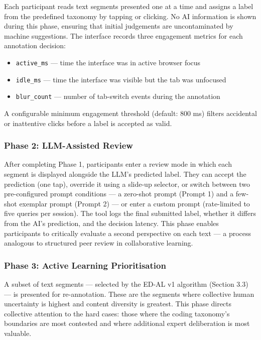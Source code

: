\documentclass[fleqn,10pt]{JLA_article}
\begin{document}
Each participant reads text segments presented one at a time and assigns a label from
the predefined taxonomy by tapping or clicking. No AI information is shown during this
phase, ensuring that initial judgements are uncontaminated by machine suggestions.
The interface records three engagement metrics for each annotation decision:

\begin{itemize}[noitemsep]
  \item \texttt{active\_ms} — time the interface was in active browser focus
  \item \texttt{idle\_ms} — time the interface was visible but the tab was unfocused
  \item \texttt{blur\_count} — number of tab-switch events during the annotation
\end{itemize}

A configurable minimum engagement threshold (default: 800 ms) filters accidental or
inattentive clicks before a label is accepted as valid.

\subsubsection{Phase 2: LLM-Assisted Review}

After completing Phase 1, participants enter a review mode in which each segment is
displayed alongside the LLM's predicted label. They can accept the prediction (one tap),
override it using a slide-up selector, or switch between two pre-configured prompt
conditions — a zero-shot prompt (Prompt 1) and a few-shot exemplar prompt (Prompt 2) —
or enter a custom prompt (rate-limited to five queries per session). The tool logs the
final submitted label, whether it differs from the AI's prediction, and the decision
latency. This phase enables participants to critically evaluate a second perspective on
each text — a process analogous to structured peer review in collaborative learning.

\subsubsection{Phase 3: Active Learning Prioritisation}

A subset of text segments — selected by the ED-AL v1 algorithm (Section 3.3) — is
presented for re-annotation. These are the segments where collective human uncertainty is
highest and content diversity is greatest. This phase directs collective attention to the
hard cases: those where the coding taxonomy's boundaries are most contested and where
additional expert deliberation is most valuable.
\end{document}
